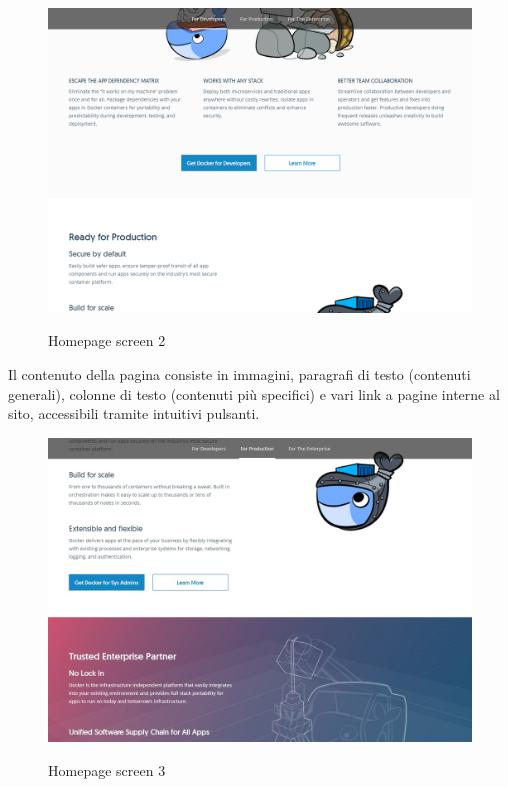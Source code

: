 \documentclass[a4paper]{article}
\begin{document}
\begin{figure}[H]
	\centering
	\includegraphics[width=\linewidth]{images/homepage2.png}
    \label{fig:homepage2}
    \caption{Homepage screen 2}
\end{figure}

\noindent Il contenuto della pagina consiste in immagini, paragrafi di testo (contenuti generali), colonne di testo (contenuti più specifici) e vari link a pagine interne al sito, accessibili tramite intuitivi pulsanti.

\begin{figure}[H]
	\centering
	\includegraphics[width=\linewidth]{images/homepage3.jpg}
    \label{fig:homepage3}
    \caption{Homepage screen 3}
\end{figure}
\end{document}
